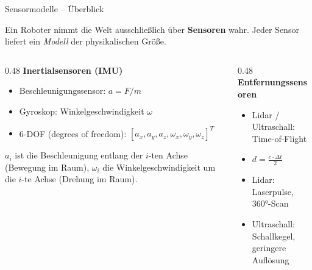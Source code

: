 \documentclass[%
  aspectratio=169,
  10pt
]{beamer}
\newcommand{\hl}[1]{{\color{fbblau}\textbf{#1}}}
\begin{document}
\begin{frame}{Sensormodelle -- Überblick}

Ein Roboter nimmt die Welt ausschließlich über \hl{Sensoren} wahr.
Jeder Sensor liefert ein \emph{Modell} der physikalischen Größe.

\vspace{3mm}
\begin{columns}[T]
  \begin{column}{0.48\textwidth}
    \textbf{Inertialsensoren (IMU)}
    \begin{itemize}
      \item Beschleunigungssensor: $a = F/m$
      \item Gyroskop: Winkelgeschwindigkeit $\omega$
      \item 6-DOF (degrees of freedom): $[a_x, a_y, a_z, \omega_x, \omega_y, \omega_z]^T$
    \end{itemize}
    $a_i$ ist die Beschleunigung entlang der $i$-ten Achse (Bewegung im Raum), $\omega_i$ die Winkelgeschwindigkeit um die $i$-te Achse (Drehung im Raum).
  \end{column}
  \begin{column}{0.48\textwidth}
    \textbf{Entfernungssensoren}
    \begin{itemize}
      \item Lidar / Ultraschall: Time-of-Flight
      \item $d = \frac{c \cdot \Delta t}{2}$
      \item Lidar: Laserpulse, $360°$-Scan
      \item Ultraschall: Schallkegel, geringere Auflösung
    \end{itemize}
  \end{column}
\end{columns}

\end{frame}
\end{document}
